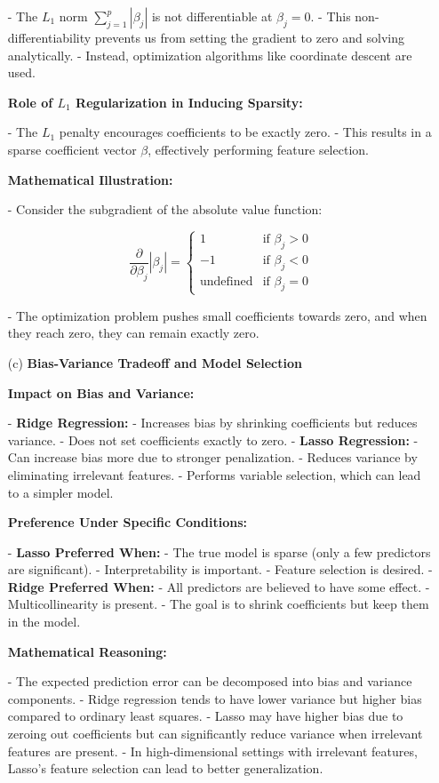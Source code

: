 \documentclass{article}
\begin{document}
\begin{enumerate}
    - The \( L_1 \) norm \( \sum_{j=1}^p |\beta_j| \) is not differentiable at \( \beta_j = 0 \).
    - This non-differentiability prevents us from setting the gradient to zero and solving analytically.
    - Instead, optimization algorithms like coordinate descent are used.
    
    \textbf{Role of \( L_1 \) Regularization in Inducing Sparsity:}
    
    - The \( L_1 \) penalty encourages coefficients to be exactly zero.
    - This results in a sparse coefficient vector \( \beta \), effectively performing feature selection.
    
    \textbf{Mathematical Illustration:}
    
    - Consider the subgradient of the absolute value function:
    
      \[
      \frac{\partial}{\partial \beta_j} |\beta_j| = 
      \begin{cases}
      1 & \text{if } \beta_j > 0 \\
      -1 & \text{if } \beta_j < 0 \\
      \text{undefined} & \text{if } \beta_j = 0
      \end{cases}
      \]
    
    - The optimization problem pushes small coefficients towards zero, and when they reach zero, they can remain exactly zero.
    
    \item[(c)] \textbf{Bias-Variance Tradeoff and Model Selection}
    
    \textbf{Impact on Bias and Variance:}
    
    - \textbf{Ridge Regression:}
      - Increases bias by shrinking coefficients but reduces variance.
      - Does not set coefficients exactly to zero.
    - \textbf{Lasso Regression:}
      - Can increase bias more due to stronger penalization.
      - Reduces variance by eliminating irrelevant features.
      - Performs variable selection, which can lead to a simpler model.
    
    \textbf{Preference Under Specific Conditions:}
    
    - \textbf{Lasso Preferred When:}
      - The true model is sparse (only a few predictors are significant).
      - Interpretability is important.
      - Feature selection is desired.
    - \textbf{Ridge Preferred When:}
      - All predictors are believed to have some effect.
      - Multicollinearity is present.
      - The goal is to shrink coefficients but keep them in the model.
    
    \textbf{Mathematical Reasoning:}
    
    - The expected prediction error can be decomposed into bias and variance components.
    - Ridge regression tends to have lower variance but higher bias compared to ordinary least squares.
    - Lasso may have higher bias due to zeroing out coefficients but can significantly reduce variance when irrelevant features are present.
    - In high-dimensional settings with irrelevant features, Lasso's feature selection can lead to better generalization.
    
\end{enumerate}
\end{document}
